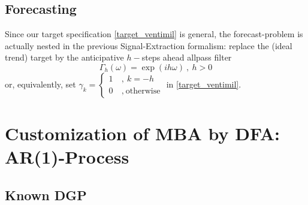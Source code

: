 \documentclass[a4paper]{book}
\begin{document}
\subsection{Forecasting}

Since our target specification \ref{target_ventimil} is general, the forecast-problem is actually nested in the previous Signal-Extraction formalism: replace the (ideal trend) target by the anticipative $h-$steps ahead allpass filter
\[\Gamma_h(\omega)=\exp(ih\omega)~,~h>0\]
or, equivalently, set $\gamma_k=\left\{\begin{array}{cc}1~&,~k=-h\\0~&,~\textrm{otherwise}\end{array}\right.$
in  \ref{target_ventimil}.











\section{Customization of MBA by DFA: AR(1)-Process} \label{cust_mba_dfa_ar1}



\subsection{Known DGP} \label{true_dgp}
\end{document}

